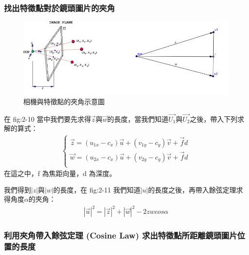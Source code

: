 	\subsubsection{找出特徵點對於鏡頭圖片的夾角}
	
	\begin{figure}
	\begin{center}
	  \includegraphics[width=1.0\textwidth]{figures/Included_Angle.jpg}
	  \caption{相機與特徵點的夾角示意圖}
	  \label{fig:Included Angle}
	\end{center}
	\end{figure}
	
	在 fig:2-10 當中我們要先求得$\vec{z}$與$\vec{w}$的長度，當我們知道$\vec{U_1}$與$\vec{U_2}$之後，帶入下列求解的算式：
	\begin{align}
		\left\{
		\begin{array}{cccc}
		\vec{z} = (u_{1x} - c_x)\vec{u} + (v_{1y} - c_y)\vec{v} + \vec{f}d\\
		\vec{w} = (u_{2x} - c_x)\vec{u} + (v_{2y} - c_y)\vec{v} + \vec{f}d\\
		\end{array}
		\right.
	\end{align}
	在這之中，f 為焦距向量，d 為深度。	
	
	我們得到$|z|$與$|w|$的長度，在 fig:2-11 我們知道$|u|$的長度之後，再帶入餘弦定理求得角度$\alpha$的夾角：
	\begin{align}
		|\vec{u}|^2 = |\vec{z}|^2 + |\vec{w}|^2 - 2zwcos\alpha
	\end{align}	
	
	\subsubsection{利用夾角帶入餘弦定理 (Cosine Law) 求出特徵點所距離鏡頭圖片位置的長度}
	
